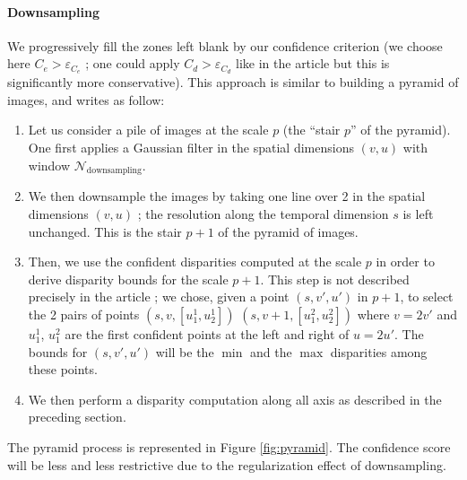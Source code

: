 \documentclass{article}
\theoremstyle{definition}
\begin{document}
\paragraph{Downsampling} We progressively fill the zones left blank by our confidence criterion (we choose here $C_e > \varepsilon_{C_e}$ ; one could apply $C_d > \varepsilon_{C_d}$ like in the article but this is significantly more conservative). This approach is similar to building a pyramid of images, and writes as follow:
\begin{enumerate}
 \item Let us consider a pile of images at the scale $p$ (the ``stair $p$'' of the pyramid). One first applies a Gaussian filter in the spatial dimensions $(v, u)$ with window $\mathcal{N}_\text{downsampling}$.
 \item We then downsample the images by taking one line over 2 in the spatial dimensions $(v, u)$ ; the resolution along the temporal dimension $s$ is left unchanged. This is the stair $p+1$ of the pyramid of images.
 \item Then, we use the confident disparities computed at the scale $p$ in order to derive disparity bounds for the scale $p+1$. This step is not described precisely in the article ; we chose, given a point $(s, v', u')$ in $p+1$, to select the 2 pairs of points $(s, v, [u_1^1, u_2^1])$ $(s, v+1, [u_1^2, u_2^2])$ where $v = 2 v'$ and $u_1^1$, $u_1^2$ are the first confident points at the left and right of $u=2u'$. The bounds for $(s, v', u')$ will be the $\min$ and the $\max$ disparities among these points.
 \item We then perform a disparity computation along all axis as described in the preceding section.
\end{enumerate}
The pyramid process is represented in Figure \ref{fig:pyramid}. The confidence score will be less and less restrictive due to the regularization effect of downsampling.
\end{document}
